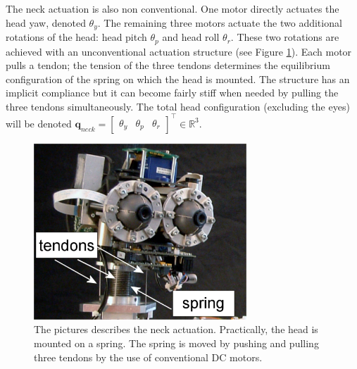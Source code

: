 The neck actuation is also non conventional. One motor directly actuates the head yaw, denoted $\theta_y$. The remaining three motors actuate the two additional rotations of the head: head pitch $\theta_p$ and head roll $\theta_r$. These two rotations are achieved with an unconventional actuation structure (see Figure \ref{Fig:Head}). Each motor pulls a tendon; the tension of the three tendons determines the equilibrium configuration of the spring on which the head is mounted. The structure has an implicit compliance but it can become fairly stiff when needed by pulling the three tendons simultaneously. The total head configuration (excluding the eyes) will be denoted $\mathbf q_{neck} = \begin{bmatrix} \theta_y & \theta_p & \theta_r \end{bmatrix}^\top \in \mathbb R^3$.

\begin{figure}
\centering
\includegraphics[width=80mm]{Figure/Head.eps}
\caption{The pictures describes the neck actuation. Practically, the head is mounted on a spring. The spring is moved by pushing and pulling three tendons by the use of conventional DC motors.}
\label{Fig:Head}
\end{figure}

